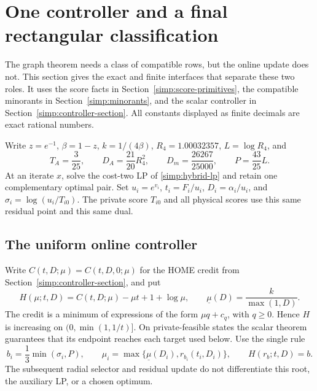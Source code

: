 \section{One controller and a final rectangular classification}
\label{simp:algorithm-interface}

The graph theorem needs a class of compatible rows, but the online
update does not.  This section gives the exact and finite interfaces
that separate these two roles.  It uses the score facts in
Section~\ref{simp:score-primitives}, the compatible minorants in
Section~\ref{simp:minorants}, and the scalar controller in
Section~\ref{simp:controller-section}.  All constants displayed as finite
decimals are exact rational numbers.

Write $z=e^{-1}$, $\beta=1-z$, $k=1/(4\beta)$,
$R_4=1.00032357$, $L=\log R_4$, and
\[
 T_A=\frac3{25},\qquad
 D_A=\frac{21}{20}R_4^2,\qquad
 D_m=\frac{26267}{25000},\qquad
 P=\frac{43}{25}L.
\]
At an iterate $x$, solve the cost-two LP of
\eqref{simp:hybrid-lp} and retain one complementary optimal pair.
Set $u_i=e^{v_i}$, $t_i=F_i/u_i$, $D_i=\alpha_i/u_i$, and
$\sigma_i=\log(u_i/T_{i0})$.  The private score $T_{i0}$ and all
physical scores use this same residual point and this same dual.

\subsection{The uniform online controller}

Write $C(t,D;\mu)=C(t,D,0;\mu)$ for the HOME credit from
Section~\ref{simp:controller-section}, and put
\[
 H(\mu;t,D)=C(t,D;\mu)-\mu t+1+\log\mu,
 \qquad \underline\mu(D)=\frac{k}{\max(1,D)}.
\]
The credit is a minimum of expressions of the form $\mu q+c_q$,
with $q\ge0$.  Hence $H$ is increasing on
$(0,\min(1,1/t)]$.  On private-feasible states the scalar theorem
guarantees that its endpoint reaches each target used below.
Use the single rule
\begin{equation}\label{simp:uniform-controller}
 b_i=\frac13\min(\sigma_i,P),\qquad
 \mu_i=\max\{\underline\mu(D_i),r_{b_i}(t_i,D_i)\},
 \qquad H(r_b;t,D)=b.
\end{equation}
The subsequent radial selector and residual update do not
differentiate this root, the auxiliary LP, or a chosen optimum.

